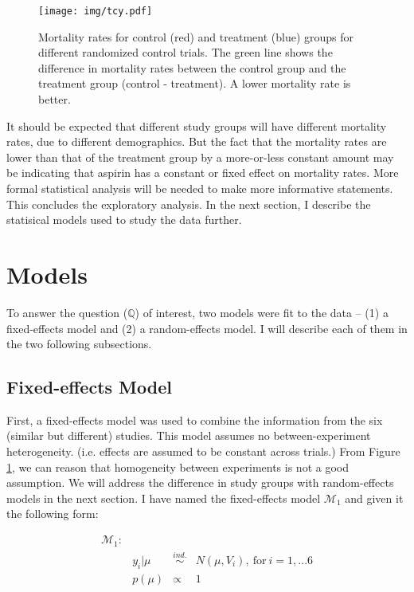 \documentclass{../../tex_template/asaproc}
\newcommand{\M}{\mathcal{M}}
\newcommand{\Q}{\mathbb{Q}}
\newcommand{\simi}{\overset{ind.}{\sim}}
\begin{document}
\begin{figure}%
  \texttt{[image: img/tcy.pdf]}
  \caption{\small Mortality rates for control (red) and treatment (blue) groups
  for different randomized control trials. The green line shows the difference
  in mortality rates between the control group and the treatment group (control -
  treatment). A lower mortality rate is better.}
  \label{fig:tcy}
\end{figure}

It should be expected that different study groups will have different mortality
rates, due to different demographics. But the fact that the mortality rates are
lower than that of the treatment group by a more-or-less constant amount may be
indicating that aspirin has a constant or fixed effect on mortality rates.
More formal statistical analysis will be needed to make more informative
statements.\\

This concludes the exploratory analysis. In the next section, I describe the
statisical models used to study the data further.\\

\section{Models} 
To answer the question ($\Q$) of interest, two models were fit to the data --
(1) a fixed-effects model and (2) a random-effects model. I will describe each
of them in the two following subsections.\\

\subsection{Fixed-effects Model}
First, a fixed-effects model was used to combine the information from the six
(similar but different) studies. This model assumes no between-experiment
heterogeneity. (i.e. effects are assumed to be constant across trials.) From
Figure \ref{fig:tcy}, we can reason that homogeneity between experiments is not
a good assumption. We will address the difference in study groups with
random-effects models in the next section. I have named the fixed-effects
model $\M_1$ and given it the following form:

$$
\begin{array}{lrcl}
  \M_1: \\
  & y_i | \mu &\simi& N(\mu,V_i),~\text{for$~i = 1,...6$}\\
  & p(\mu) &\propto& 1\\
\end{array}
$$
\end{document}
